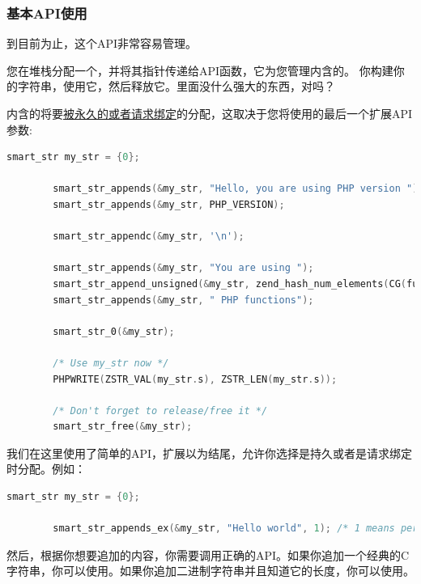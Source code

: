 \subsubsection{基本API使用}

到目前为止，这个API非常容易管理。

您在堆栈分配一个，并将其指针传递给API函数，它为您管理内含的。 你构建你的字符串，使用它，然后释放它。里面没什么强大的东西，对吗？

内含的将要\href{http://www.phpinternalsbook.com/php7/memory_management/zend_memory_manager.html}{被永久的或者请求绑定}的分配，这取决于您将使用的最后一个扩展API参数:

\begin{lstlisting}[language=c]
        smart_str my_str = {0};

        smart_str_appends(&my_str, "Hello, you are using PHP version ");
        smart_str_appends(&my_str, PHP_VERSION);

        smart_str_appendc(&my_str, '\n');

        smart_str_appends(&my_str, "You are using ");
        smart_str_append_unsigned(&my_str, zend_hash_num_elements(CG(function_table)));
        smart_str_appends(&my_str, " PHP functions");

        smart_str_0(&my_str);

        /* Use my_str now */
        PHPWRITE(ZSTR_VAL(my_str.s), ZSTR_LEN(my_str.s));

        /* Don't forget to release/free it */
        smart_str_free(&my_str);

\end{lstlisting}  


我们在这里使用了简单的API，扩展以为结尾，允许你选择是持久或者是请求绑定时分配。例如：

\begin{lstlisting}[language=c]
        smart_str my_str = {0};

        smart_str_appends_ex(&my_str, "Hello world", 1); /* 1 means persistent allocation */
\end{lstlisting} 

然后，根据你想要追加的内容，你需要调用正确的API。如果你追加一个经典的C字符串，你可以使用。如果你追加二进制字符串并且知道它的长度，你可以使用。

